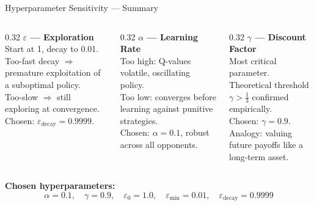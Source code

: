 \documentclass[10pt, aspectratio=169]{beamer}
\begin{document}
\begin{frame}{Hyperparameter Sensitivity — Summary}
  \begin{columns}[T]
    \begin{column}{0.32\textwidth}
      \textbf{\(\varepsilon\) — Exploration}\\[0.4em]
      Start at 1, decay to 0.01.\\
      Too-fast decay \(\Rightarrow\) premature exploitation of a suboptimal policy.\\
      Too-slow \(\Rightarrow\) still exploring at convergence.\\[0.4em]
      Chosen: \(\varepsilon_{\text{decay}} = 0.9999\).
    \end{column}
    \begin{column}{0.32\textwidth}
      \textbf{\(\alpha\) — Learning Rate}\\[0.4em]
      Too high: Q-values volatile, oscillating policy.\\
      Too low: converges before learning against punitive strategies.\\[0.4em]
      Chosen: \(\alpha = 0.1\), robust across all opponents.
    \end{column}
    \begin{column}{0.32\textwidth}
      \textbf{\(\gamma\) — Discount Factor}\\[0.4em]
      Most critical parameter.\\
      Theoretical threshold \(\gamma > \tfrac{1}{3}\) confirmed empirically.\\[0.4em]
      Chosen: \(\gamma = 0.9\).\\[0.4em]
      Analogy: valuing future payoffs like a long-term asset.
    \end{column}
  \end{columns}
  \vspace{1em}
  
  \textbf{Chosen hyperparameters:}
  \[
    \alpha = 0.1, \quad \gamma = 0.9, \quad \varepsilon_0 = 1.0, \quad \varepsilon_{\min} = 0.01, \quad \varepsilon_{\text{decay}} = 0.9999
  \]
\end{frame}
\end{document}
